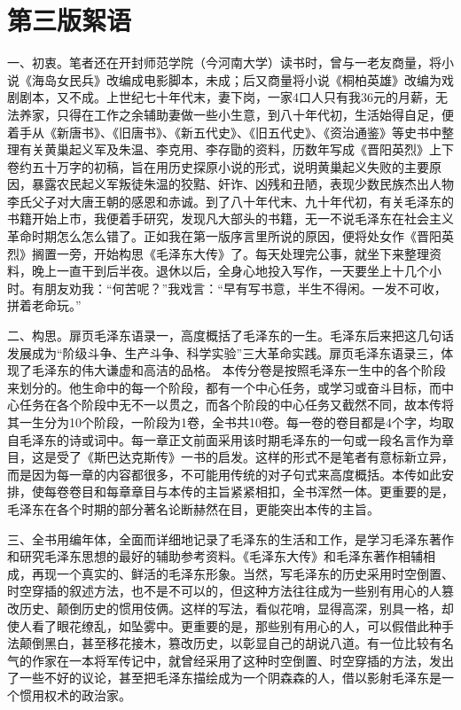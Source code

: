 \documentclass[../../dazhuan.tex]{subfiles}
\begin{document}
\clearpage
\chapter*{第三版絮语}

一、初衷。笔者还在开封师范学院（今河南大学）读书时，曾与一老友商量，将小说《海岛女民兵》改编成电影脚本，未成；后又商量将小说《桐柏英雄》改编为戏剧剧本，又不成。上世纪七十年代末，妻下岗，一家4口人只有我36元的月薪，无法养家，只得在工作之余辅助妻做一些小生意，到八十年代初，生活始得自足，便着手从《新唐书》、《旧唐书》、《新五代史》、《旧五代史》、《资治通鉴》等史书中整理有关黄巢起义军及朱温、李克用、李存勖的资料，历数年写成《晋阳英烈》上下卷约五十万字的初稿，旨在用历史探原小说的形式，说明黄巢起义失败的主要原因，暴露农民起义军叛徒朱温的狡黠、奸诈、凶残和丑陋，表现少数民族杰出人物李氏父子对大唐王朝的感恩和赤诚。到了八十年代末、九十年代初，有关毛泽东的书籍开始上市，我便着手研究，发现凡大部头的书籍，无一不说毛泽东在社会主义革命时期怎么怎么错了。正如我在第一版序言里所说的原因，便将处女作《晋阳英烈》搁置一旁，开始构思《毛泽东大传》了。每天处理完公事，就坐下来整理资料，晚上一直干到后半夜。退休以后，全身心地投入写作，一天要坐上十几个小时。有朋友劝我：“何苦呢？”我戏言：“早有写书意，半生不得闲。一发不可收，拼着老命玩。”

二、构思。扉页毛泽东语录一，高度概括了毛泽东的一生。毛泽东后来把这几句话发展成为“阶级斗争、生产斗争、科学实验”三大革命实践。扉页毛泽东语录三，体现了毛泽东的伟大谦虚和高洁的品格。
本传分卷是按照毛泽东一生中的各个阶段来划分的。他生命中的每一个阶段，都有一个中心任务，或学习或奋斗目标，而中心任务在各个阶段中无不一以贯之，而各个阶段的中心任务又截然不同，故本传将其一生分为10个阶段，一阶段为1卷，全书共10卷。每一卷的卷目都是4个字，均取自毛泽东的诗或词中。每一章正文前面采用该时期毛泽东的一句或一段名言作为章目，这是受了《斯巴达克斯传》一书的启发。这样的形式不是笔者有意标新立异，而是因为每一章的内容都很多，不可能用传统的对子句式来高度概括。本传如此安排，使每卷卷目和每章章目与本传的主旨紧紧相扣，全书浑然一体。更重要的是，毛泽东在各个时期的部分著名论断赫然在目，更能突出本传的主旨。  

三、全书用编年体，全面而详细地记录了毛泽东的生活和工作，是学习毛泽东著作和研究毛泽东思想的最好的辅助参考资料。《毛泽东大传》和毛泽东著作相辅相成，再现一个真实的、鲜活的毛泽东形象。当然，写毛泽东的历史采用时空倒置、时空穿插的叙述方法，也不是不可以的，但这种方法往往成为一些别有用心的人篡改历史、颠倒历史的惯用伎俩。这样的写法，看似花哨，显得高深，别具一格，却使人看了眼花缭乱，如坠雾中。更重要的是，那些别有用心的人，可以假借此种手法颠倒黑白，甚至移花接木，篡改历史，以彰显自己的胡说八道。有一位比较有名气的作家在一本将军传记中，就曾经采用了这种时空倒置、时空穿插的方法，发出了一些不好的议论，甚至把毛泽东描绘成为一个阴森森的人，借以影射毛泽东是一个惯用权术的政治家。
\end{document}
